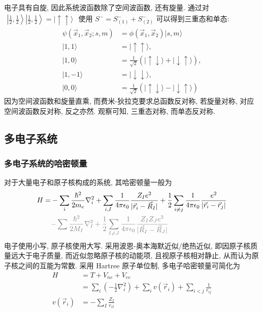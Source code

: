 \documentclass[../../main.tex]{subfiles}
\begin{document}
电子具有自旋, 因此系统波函数除了空间波函数, 还有旋量. 通过对 $\begin{aligned}
  \left|\frac{1}{2},\frac{1}{2}\right\rangle\left|\frac{1}{2},\frac{1}{2}\right\rangle = |\uparrow\uparrow\rangle
\end{aligned}$ 使用 $S^{-} = S^{-}_{(1)} + S^{-}_{(2)}$ 可以得到三重态和单态:
\begin{align*}
  \psi(\vec{x}_{1},\vec{x}_{2};s,m)&=\phi(\vec{x}_{1},\vec{x}_{2})|s,m\rangle\\
  |1,1\rangle &= |\uparrow\uparrow\rangle,\\
  |1,0\rangle &= \frac{1}{\sqrt{2}}(|\uparrow\downarrow\rangle + |\downarrow\uparrow\rangle),\\
  |1,-1\rangle &= |\downarrow\downarrow\rangle,\\
  |0,0\rangle &= \frac{1}{\sqrt{2}}(|\uparrow\downarrow\rangle - |\downarrow\uparrow\rangle)
\end{align*}
因为空间波函数和旋量直乘, 而费米-狄拉克要求总函数反对称, 若旋量对称, 对应空间波函数反对称, 反之亦然. 观察可知, 三重态对称, 而单态反对称.

\subsection{多电子系统}
\subsubsection{多电子系统的哈密顿量}

对于大量电子和原子核构成的系统, 其哈密顿量一般为
\begin{align*}
  H = &-\sum_{i}\frac{\hbar^{2}}{2m_{e}}\nabla_{i}^{2} + \sum_{i,I}\frac{1}{4\pi\epsilon_0}\frac{Z_{I}e^{2}}{|\vec{r}_{i}-\vec{R}_{I}|} + \frac{1}{2}\sum_{i\neq j}\frac{1}{4\pi\epsilon_0}\frac{e^{2}}{|\vec{r}_{i} - \vec{r}_{j}|}\\
  &{\color{gray}{- \sum\frac{\hbar^{2}}{2M_{I}}\nabla_{I}^{2} + \frac{1}{2}\sum_{I\neq J}\frac{1}{4\pi\epsilon_0}\frac{Z_{I}Z_{J}e^{2}}{|\vec{R}_{I} - \vec{R}_{J}|}}}
\end{align*}
电子使用小写, 原子核使用大写. 采用波恩-奥本海默近似/绝热近似, 即因原子核质量远大于电子质量, 而近似忽略原子核的动能项, 且视原子核相对静止, 从而认为原子核之间的互能为常数. 采用 Hartree 原子单位制, 多电子哈密顿量可简化为
\begin{align*}
  H &= T + V_{ne} + V_{ee}\\
    &= \sum_{i}\left(-\frac{1}{2}\nabla_{i}^{2}\right) + \sum_{i}v\left(\vec{r}_{i}\right) + \sum_{i < j}\frac{1}{r_{ij}} \\
    v\left(\vec{r}_{i}\right) &= -\sum_{I}\frac{Z_{I}}{r_{iI}}
\end{align*}
\end{document}
